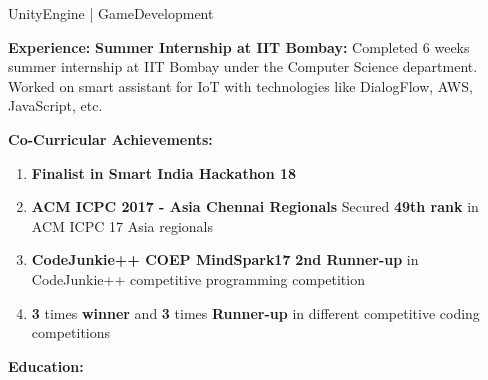 \documentclass[11pt]{article}
\begin{document}
\begin{center}
\begin{minipage}[t]{0.65\textwidth}
\begin{LARGE}
{\begin{enumerate}
						UnityEngine | GameDevelopment
					\end{enumerate}
				}
			\end{LARGE}								
		\end{minipage}
		\linebreak\linebreak\linebreak
		\begin{minipage}[t]{0.35\textwidth}
			\raggedright\smallskip
			\begin{LARGE}
				\textbf{Experience:}\medskip%
				{\small
					\newline
					\textbf{Summer Internship at IIT Bombay:}
					\newline
					Completed 6 weeks summer internship at IIT Bombay under the Computer Science department. Worked on smart assistant for IoT with technologies like DialogFlow, AWS, JavaScript, etc.
				}
			\end{LARGE}
		\end{minipage}%
		\begin{minipage}[t]{0.65\textwidth}
			\raggedright\smallskip
			\begin{LARGE}
				\textbf{Co-Curricular Achievements:}\medskip%
				{\small
					\begin{enumerate}
						\item \textbf{Finalist in Smart India Hackathon 18}
						\item \textbf{ACM ICPC 2017 - Asia Chennai Regionals}\linebreak
						Secured \textbf{49th rank} in ACM ICPC 17 Asia regionals
						\item \textbf{CodeJunkie++ COEP MindSpark17}\linebreak
						\textbf{2nd Runner-up} in CodeJunkie++ competitive programming competition
						\item \textbf{3} times \textbf{winner} and \textbf{3} times \textbf{Runner-up} in different competitive coding competitions
					\end{enumerate}
				}
			\end{LARGE}								
		\end{minipage}
		\linebreak\linebreak\linebreak
		\raggedright\smallskip
		\begin{LARGE}
			\textbf{Education:}
			\medskip\linebreak%
			\begin{tabu} to \textwidth {|X[l]|X[4]|X[c]|X[c]|}

\end{tabu}
\end{LARGE}
\end{center}
\end{document}
